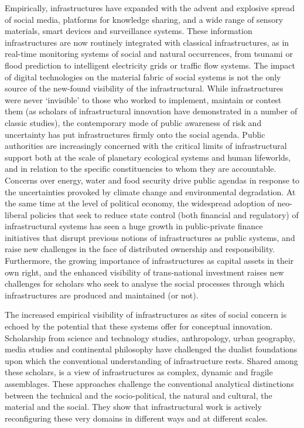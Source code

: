 \documentclass[a4,portrait,11pt]{article}
\begin{document}
\begin{flushleft}
Empirically, infrastructures have expanded with the advent and explosive spread of social media, platforms for knowledge sharing, and a wide range of sensory materials, smart devices and surveillance systems. These information infrastructures are now routinely integrated with classical infrastructures, as in real-time monitoring systems of social and natural occurrences, from tsunami or flood prediction to intelligent electricity grids or traffic flow systems. The impact of digital technologies on the material fabric of social systems is not the only source of the new-found visibility of the infrastructural. While infrastructures were never {`}invisible' to those who worked to implement, maintain or contest them (as scholars of infrastructural innovation have demonstrated in a number of classic studies), the contemporary mode of public awareness of risk and uncertainty has put infrastructures firmly onto the social agenda. Public authorities are increasingly concerned with the critical limits of infrastructural support both at the scale of planetary ecological systems and human lifeworlds, and in relation to the specific constituencies to whom they are accountable. Concerns over energy, water and food security drive public agendas in response to the uncertainties provoked by climate change and environmental degradation. At the same time at the level of political economy, the widespread adoption of neo-liberal policies that seek to reduce state control (both financial and regulatory) of infrastructural systems has seen a huge growth in public-private finance initiatives that disrupt previous notions of infrastructures as public systems, and raise new challenges in the face of distributed ownership and responsibility. Furthermore, the growing importance of infrastructures as capital assets in their own right, and the enhanced visibility of trans-national investment raises new challenges for scholars who seek to analyse the social processes through which infrastructures are produced and maintained (or not). 
\end{flushleft}


\begin{flushleft}

\end{flushleft}


\begin{flushleft}
The increased empirical visibility of infrastructures as sites of social concern is echoed by the potential that these systems offer for conceptual innovation. Scholarship from science and technology studies, anthropology, urban geography, media studies and continental philosophy have challenged the dualist foundations upon which the conventional understanding of infrastructure rests. Shared among these scholars, is a view of infrastructures as complex, dynamic and fragile assemblages. These approaches challenge the conventional analytical distinctions between the technical and the socio-political, the natural and cultural, the material and the social. They show that infrastructural work is actively reconfiguring these very domains in different ways and at different scales. 
\end{flushleft}
\end{document}
